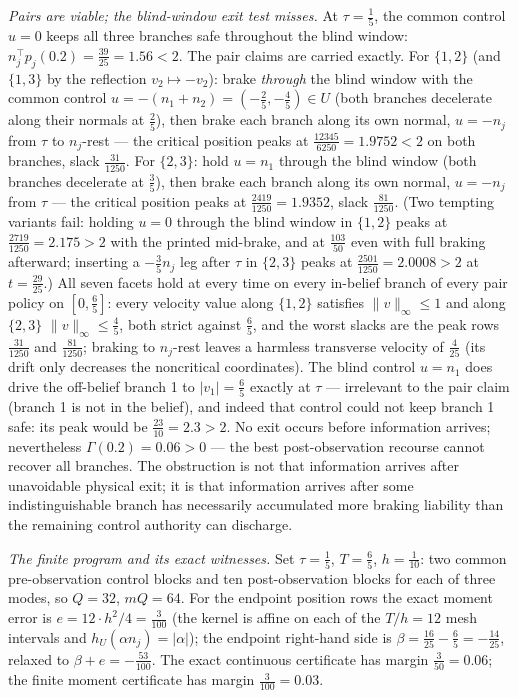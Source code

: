 \documentclass[10pt,twocolumn]{article}
\theoremstyle{plain}
\theoremstyle{definition}
\theoremstyle{remark}
\begin{document}
\emph{Pairs are viable; the blind-window exit test misses.} At
\(\tau = \tfrac15\), the common control \(u = 0\) keeps all three branches
safe throughout the blind window:
\(n_j^\top p_j(0.2) = \tfrac{39}{25} = 1.56 < 2\). The pair claims are
carried exactly. For \(\{1,2\}\) (and \(\{1,3\}\) by the reflection
\(v_2 \mapsto -v_2\)): brake \emph{through} the blind window with the
common control \(u = -(n_1 + n_2) = (-\tfrac25, -\tfrac45) \in U\) (both
branches decelerate along their normals at \(\tfrac25\)), then brake each
branch along its own normal, \(u = -n_j\) from \(\tau\) to
\(n_j\)-rest --- the critical position peaks at
\(\tfrac{12345}{6250} = 1.9752 < 2\) on both branches, slack
\(\tfrac{31}{1250}\). For \(\{2,3\}\): hold \(u = n_1\) through the
blind window (both branches decelerate at \(\tfrac35\)), then brake each
branch along its own normal, \(u = -n_j\) from \(\tau\) --- the critical
position peaks at \(\tfrac{2419}{1250} = 1.9352\), slack
\(\tfrac{81}{1250}\). (Two tempting variants fail: holding \(u = 0\)
through the blind window in \(\{1,2\}\) peaks at
\(\tfrac{2719}{1250} = 2.175 > 2\) with the printed mid-brake, and at
\(\tfrac{103}{50}\) even with full braking afterward; inserting a
\(-\tfrac35 n_j\) leg after \(\tau\) in \(\{2,3\}\) peaks at
\(\tfrac{2501}{1250} = 2.0008 > 2\) at \(t = \tfrac{29}{25}\).) All
seven facets hold at every time on every in-belief branch of every pair
policy on \([0, \tfrac65]\): every velocity value along \(\{1,2\}\)
satisfies \(\|v\|_\infty \le 1\) and along \(\{2,3\}\)
\(\|v\|_\infty \le \tfrac45\), both strict against
\(\tfrac65\), and the worst slacks are the peak rows
\(\tfrac{31}{1250}\) and \(\tfrac{81}{1250}\); braking to
\(n_j\)-rest leaves a harmless transverse velocity of \(\tfrac4{25}\)
(its drift only decreases the noncritical coordinates). The blind control
\(u = n_1\) does drive the off-belief branch 1 to \(|v_1| = \tfrac65\)
exactly at \(\tau\) --- irrelevant to the pair claim (branch 1 is not in
the belief), and indeed that control could not keep branch 1 safe: its
peak would be \(\tfrac{23}{10} = 2.3 > 2\). No exit occurs
before information arrives; nevertheless \(\Gamma(0.2) = 0.06 > 0\) --- the best
post-observation recourse cannot recover all branches. The obstruction is
not that information arrives after unavoidable physical exit; it is that
information arrives after some indistinguishable branch has necessarily
accumulated more braking liability than the remaining control authority can
discharge.

\emph{The finite program and its exact witnesses.} Set
\(\tau = \tfrac15\), \(T = \tfrac65\), \(h = \tfrac1{10}\): two common
pre-observation control blocks and ten post-observation blocks for each of
three modes, so \(Q = 32\), \(mQ = 64\). For the endpoint position rows the
exact moment error is \(e = 12 \cdot h^2/4 = \tfrac{3}{100}\) (the kernel is
affine on each of the \(T/h = 12\) mesh intervals and
\(h_U(\alpha n_j) = |\alpha|\)); the endpoint right-hand side is
\(\beta = \tfrac{16}{25} - \tfrac65 = -\tfrac{14}{25}\), relaxed to
\(\beta + e = -\tfrac{53}{100}\). The exact continuous certificate has
margin \(\tfrac{3}{50} = 0.06\); the finite moment certificate has margin
\(\tfrac{3}{100} = 0.03\).
\end{document}
